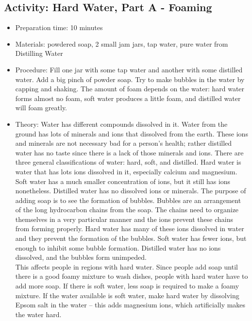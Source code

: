 \begin{itemize}
{\begin{itemize}
\begin{itemize}
{\subsection{Activity: Hard Water, Part A - Foaming}
\begin{itemize}
\item{Preparation time: 10 minutes}
\item{Materials: powdered soap, 2 small jam jars, tap water, pure water from Distilling Water}
\item{Procedure: Fill one jar with some tap water and another with some distilled water. Add a big pinch of powder soap. Try to make bubbles in the water by capping and shaking. The amount of foam depends on the water: hard water forms almost no foam, soft water produces a little foam, and distilled water will foam greatly.}
\item{Theory: Water has different compounds dissolved in it. Water from the ground has lots of minerals and ions that dissolved from the earth. These ions and minerals are not necessary bad for a person’s health; rather distilled water has no taste since there is a lack of those minerals and ions. There are three general classifications of water: hard, soft, and distilled. Hard water is water that has lots ions dissolved in it, especially calcium and magnesium. Soft water has a much smaller concentration of ions, but it still has ions nonetheless. Distilled water has no dissolved ions or minerals. The purpose of adding soap is to see the formation of bubbles. Bubbles are an arrangement of the long hydrocarbon chains from the soap. The chains need to organize themselves in a very particular manner and the ions prevent these chains from forming properly. Hard water has many of these ions dissolved in water and they prevent the formation of the bubbles. Soft water has fewer ions, but enough to inhibit some bubble formation. Distilled water has no ions dissolved, and the bubbles form unimpeded.\\
This affects people in regions with hard water. Since people add soap until there is a good foamy mixture to wash dishes, people with hard water have to add more soap. If there is soft water, less soap is required to make a foamy mixture. If the water available is soft water, make hard water by dissolving Epsom salt in the water – this adds magnesium ions, which artificially makes the water hard.}
\end{itemize}

}
\end{itemize}
\end{itemize}}
\end{itemize}
